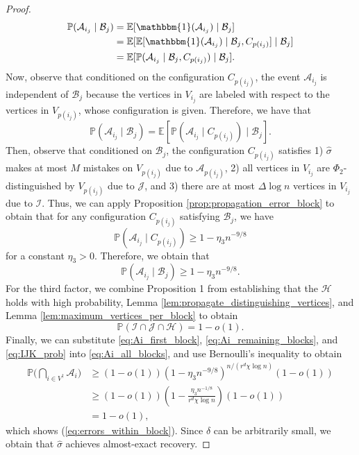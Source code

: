 \documentclass{article}
\renewcommand{\P}{\mathbb{P}}
\newcommand{\E}{\mathbb{E}}
\newcommand{\1}{\mathbbm{1}}
\newcommand{\calA}{\mathcal{A}}
\newcommand{\calB}{\mathcal{B}}
\newcommand{\calH}{\mathcal{H}}
\newcommand{\calI}{\mathcal{I}}
\newcommand{\calJ}{\mathcal{J}}
\theoremstyle{definition}
\theoremstyle{plain}
\begin{document}
\begin{proof}
\begin{equation*}
\begin{aligned}
        \P(\calA_{i_j} \mid \calB_j) &= \E[\1(\calA_{i_j}) \mid \calB_j] \\
        &= \E[ \E[\1(\calA_{i_j}) \mid \calB_j, C_{p(i_j)} ] \mid \calB_j ] \\
        &= \E[ \P(\calA_{i_j} \mid \calB_j, C_{p(i_j)}) \mid \calB_j].
    \end{aligned}
    \end{equation*}
    Now, observe that conditioned on the configuration $C_{p(i_j)}$, the event $\calA_{i_j}$ is independent of $\calB_j$ because the vertices in $V_{i_j}$ are labeled with respect to the vertices in $V_{p(i_j)}$, whose configuration is given. Therefore, we have that
    \begin{equation*}
        \P(\calA_{i_j} \mid \calB_j) = \E[ \P(\calA_{i_j} \mid C_{p(i_j)}) \mid \calB_j ].
    \end{equation*}
    Then, observe that conditioned on $\calB_j$, the configuration $C_{p(i_j)}$ satisfies 1) $\hat{\sigma}$ makes at most $M$ mistakes on $V_{p(i_j)}$ due to $\calA_{p(i_j)}$, 2) all vertices in $V_{i_j}$ are $\Phi_2$-distinguished by $V_{p(i_j)}$ due to $\calJ$, and 3) there are at most $\Delta \log n$ vertices in $V_{i_j}$ due to $\calI$. Thus, we can apply Proposition \ref{prop:propagation_error_block} to obtain that for any configuration $C_{p(i_j)}$ satisfying $\calB_j$, we have
    \begin{equation*}
        \P(\calA_{i_j} \mid C_{p(i_j)}) \geq 1 - \eta_3 n^{-9/8}
    \end{equation*}
    for a constant $\eta_3 > 0$. Therefore, we obtain that
    \begin{equation}
    \label{eq:Ai_remaining_blocks}
        \P(\calA_{i_j} \mid \calB_j) \geq 1 - \eta_3n^{-9/8}.
    \end{equation}
    For the third factor, we combine Proposition 1 from \cite{GaudioJin2025} establishing that the $\calH$ holds with high probability, Lemma \ref{lem:propagate_distinguishing_vertices}, and Lemma \ref{lem:maximum_vertices_per_block} to obtain
    \begin{equation}
    \label{eq:IJK_prob}
        \P(\calI \cap \calJ \cap \calH) = 1 - o(1).
    \end{equation}
    Finally, we can substitute \eqref{eq:Ai_first_block}, \eqref{eq:Ai_remaining_blocks}, and \eqref{eq:IJK_prob} into \eqref{eq:Ai_all_blocks}, and use Bernoulli's inequality to obtain
    \begin{equation*}
    \begin{aligned}
        \P\bigg( \bigcap_{i \in V^\dagger} \calA_i \bigg) &\geq (1 - o(1)) \left(1 - \eta_3 n^{-9/8}\right)^{n / (r^d \chi \log n)} (1 - o(1))\\
        &\geq (1 - o(1)) \left(1 - \frac{\eta_3 n^{-1/8}}{r^d \chi \log n}\right) (1 - o(1)) \\
        &= 1 - o(1),
    \end{aligned}
    \end{equation*}
    which shows (\ref{eq:errors_within_block}). Since $\delta$ can be arbitrarily small, we obtain that $\hat{\sigma}$ achieves almost-exact recovery.


\end{proof}
\end{document}
